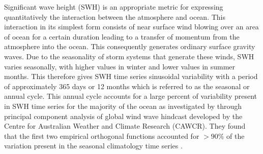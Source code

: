 \documentclass[draft,linenumbers]{agujournal2018}
\begin{document}
Significant wave height (SWH) is an appropriate metric for expressing quantitatively the interaction between the atmosphere and ocean. This interaction in its simplest form consists of near surface wind blowing over an area of ocean for a certain duration leading to a transfer of momentum from the atmosphere into the ocean. This consequently generates ordinary surface gravity waves. Due to the seasonality of storm systems that generate these winds, SWH varies seasonally, with higher values in winter and lower values in summer months. This therefore gives SWH time series sinusoidal variability with a period of approximately 365 days or 12 months which is referred to as the seasonal or annual cycle. This annual cycle accounts for a large percent of variability present in SWH time series for the majority of the ocean as investigated by \citet{echevarria2019seasonal} through principal component analysis of global wind wave hindcast developed by the Centre for Australian Weather and Climate Research (CAWCR). They found that the first two empirical orthogonal functions accounted for $>90\%$ of the variation present in the seasonal climatology time series \cite{echevarria2019seasonal}.  
\end{document}
